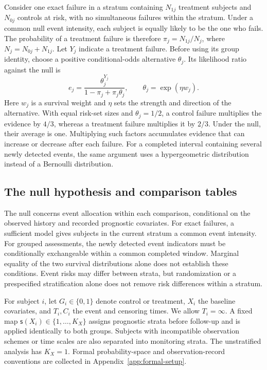 \documentclass[12pt]{article}
\theoremstyle{definition}
\theoremstyle{remark}
\begin{document}
Consider one exact failure in a stratum containing $N_{1j}$ treatment subjects and $N_{0j}$ controls at risk, with no simultaneous failures within the stratum. Under a common null event intensity, each subject is equally likely to be the one who fails. The probability of a treatment failure is therefore $\pi_j=N_{1j}/N_j$, where $N_j=N_{0j}+N_{1j}$. Let $Y_j$ indicate a treatment failure. Before using its group identity, choose a positive conditional-odds alternative $\theta_j$. Its likelihood ratio against the null is
\begin{equation}
 e_j=\frac{\theta_j^{Y_j}}{1-\pi_j+\pi_j\theta_j},
 \qquad \theta_j=\exp(\eta w_j).
 \label{eq:single-failure-factor}
\end{equation}
Here $w_j$ is a survival weight and $\eta$ sets the strength and direction of the alternative. With equal risk-set sizes and $\theta_j=1/2$, a control failure multiplies the evidence by $4/3$, whereas a treatment failure multiplies it by $2/3$. Under the null, their average is one. Multiplying such factors accumulates evidence that can increase or decrease after each failure. For a completed interval containing several newly detected events, the same argument uses a hypergeometric distribution instead of a Bernoulli distribution.

\subsection{The null hypothesis and comparison tables}
\label{sec:probability-setup}
\label{sec:covariate-adjustment}

The null concerns event allocation within each comparison, conditional on the observed history and recorded prognostic covariates. For exact failures, a sufficient model gives subjects in the current stratum a common event intensity. For grouped assessments, the newly detected event indicators must be conditionally exchangeable within a common completed window. Marginal equality of the two survival distributions alone does not establish these conditions. Event risks may differ between strata, but randomization or a prespecified stratification alone does not remove risk differences within a stratum.

For subject $i$, let $G_i\in\{0,1\}$ denote control or treatment, $X_i$ the baseline covariates, and $T_i,C_i$ the event and censoring times. We allow $T_i=\infty$. A fixed map $\mathsf s(X_i)\in\{1,\ldots,K_X\}$ assigns prognostic strata before follow-up and is applied identically to both groups. Subjects with incompatible observation schemes or time scales are also separated into monitoring strata. The unstratified analysis has $K_X=1$. Formal probability-space and observation-record conventions are collected in Appendix~\ref{app:formal-setup}.
\end{document}
